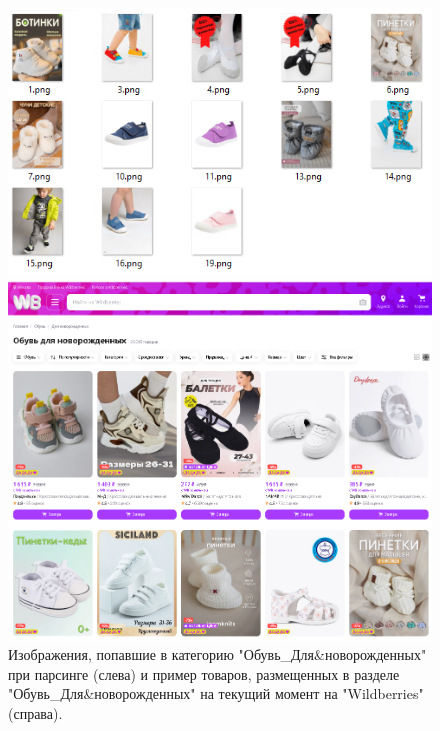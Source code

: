 \documentclass[a4paper,12pt]{extarticle}
\begin{document}
\begin{figure}[ht]
	\centering
	\begin{minipage}[b]{3in}
		\includegraphics[scale=0.5]{classification/classification_exampleshoes3.png}
	\end{minipage}
	\hfill
	\begin{minipage}[b]{3in}
		\includegraphics[scale=0.25]{classification/classification_exampleshoes4.png}
	\end{minipage}
	\caption{Изображения, попавшие в категорию "Обувь\_Для\&новорожденных" при парсинге (слева) и пример товаров, размещенных в разделе "Обувь\_Для\&новорожденных" на текущий момент на "Wildberries" (справа).}
	\label{fig:classification_exampleshoes2}
\end{figure}
\end{document}
